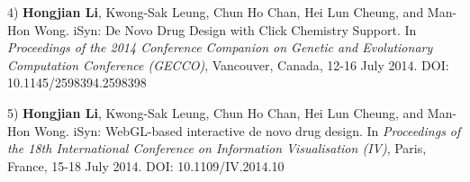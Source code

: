 4) \textbf{Hongjian Li}, Kwong-Sak Leung, Chun Ho Chan, Hei Lun Cheung, and Man-Hon Wong. iSyn: De Novo Drug Design with Click Chemistry Support. In \textit{Proceedings of the 2014 Conference Companion on Genetic and Evolutionary Computation Conference (GECCO)}, Vancouver, Canada, 12-16 July 2014. DOI: 10.1145/2598394.2598398

5) \textbf{Hongjian Li}, Kwong-Sak Leung, Chun Ho Chan, Hei Lun Cheung, and Man-Hon Wong. iSyn: WebGL-based interactive de novo drug design. In \textit{Proceedings of the 18th International Conference on Information Visualisation (IV)}, Paris, France, 15-18 July 2014. DOI: 10.1109/IV.2014.10

\chapterend
